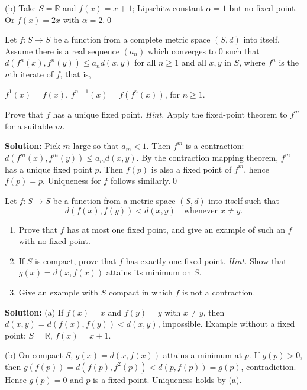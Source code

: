 (b) Take $S=\mathbb{R}$ and $f(x)=x+1$; Lipschitz constant $\alpha=1$ but no fixed point. Or $f(x)=2x$ with $\alpha=2$.\qed



\begin{problembox}
Let $f: S \to S$ be a function from a complete metric space $(S, d)$ into itself. Assume there is a real sequence $(a_n)$ which converges to $0$ such that $d(f^n(x), f^n(y)) \le a_n d(x, y)$ for all $n \ge 1$ and all $x, y$ in $S$, where $f^n$ is the $n$th iterate of $f$, that is, 

$f^1(x) = f(x)$, $f^{n+1}(x) = f(f^n(x))$, for $n \ge 1$. 

Prove that $f$ has a unique fixed point. \textit{Hint.} Apply the fixed-point theorem to $f^m$ for a suitable $m$.
\end{problembox}

\noindent\textbf{Solution:}
Pick $m$ large so that $a_m<1$. Then $f^m$ is a contraction: $d(f^m(x),f^m(y))\le a_m d(x,y)$. By the contraction mapping theorem, $f^m$ has a unique fixed point $p$. Then $f(p)$ is also a fixed point of $f^m$, hence $f(p)=p$. Uniqueness for $f$ follows similarly.\qed



\begin{problembox}
Let $f: S \to S$ be a function from a metric space $(S, d)$ into itself such that
\[ d(f(x), f(y)) < d(x, y) \quad \text{whenever } x \neq y. \]
\begin{enumerate}[label=(\alph*)]
\item Prove that $f$ has at most one fixed point, and give an example of such an $f$ with no fixed point.
\item If $S$ is compact, prove that $f$ has exactly one fixed point. \textit{Hint.} Show that $g(x) = d(x, f(x))$ attains its minimum on $S$.
\item Give an example with $S$ compact in which $f$ is not a contraction.
\end{enumerate}
\end{problembox}

\noindent\textbf{Solution:}
(a) If $f(x)=x$ and $f(y)=y$ with $x\ne y$, then $d(x,y)=d(f(x),f(y))<d(x,y)$, impossible. Example without a fixed point: $S=\mathbb{R}$, $f(x)=x+1$.

(b) On compact $S$, $g(x)=d(x,f(x))$ attains a minimum at $p$. If $g(p)>0$, then $g(f(p))=d(f(p),f^2(p))<d(p,f(p))=g(p)$, contradiction. Hence $g(p)=0$ and $p$ is a fixed point. Uniqueness holds by (a).

